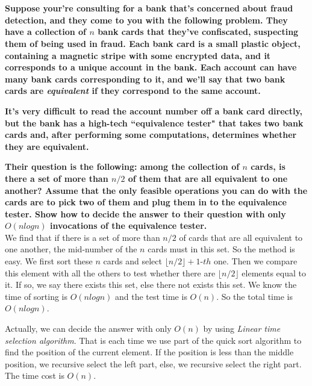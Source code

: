 
\chapter{}
\textbf{
Suppose your're consulting for a bank that's concerned about fraud detection, and they come to you with the following problem. They have a collection of $n$ bank cards that they've confiscated, suspecting them of being used in fraud. Each bank card is a small plastic object, containing a magnetic stripe with some encrypted data, and it corresponds to a unique account in the bank. Each account can have many bank cards corresponding to it, and we'll say that two bank cards are \emph{equivalent} if they correspond to the same account.
}

\textbf{
It's very difficult to read the account number off a bank card directly, but the bank has a high-tech ``equivalence tester" that takes two bank cards and, after performing some computations, determines whether they are equivalent.
}

\textbf{
Their question is the following: among the collection of $n$ cards, is there a set of more than $n/2$ of them that are all equivalent to one another? Assume that the only feasible operations you can do with the cards are to pick two of them and plug them in to the equivalence tester. Show how to decide the answer to their question with only $O(n log n)$ invocations of the equivalence tester.
}
\hspace*{\fill} \\

We find that if there is a set of more than $n/2$ of cards that are all equivalent to one another, the mid-number of the $n$ cards must in this set. So the method is easy. We first sort these $n$ cards and select $\lfloor n/2\rfloor+1$-$th$ one. Then we compare this element with all the others to test whether there are $\lfloor n/2\rfloor$ elements equal to it. If so, we say there exists this set, else there not exists this set. We know the time of sorting is $O(n log n)$ and the test time is $O(n)$. So the total time is $O(n log n)$.

Actually, we can decide the answer with only $O(n)$ by using \emph{Linear time selection algorithm}. That is each time we use part of the quick sort algorithm to find the position of the current element. If the position is less than the middle position, we recursive select the left part, else, we recursive select the right part. The time cost is $O(n)$.